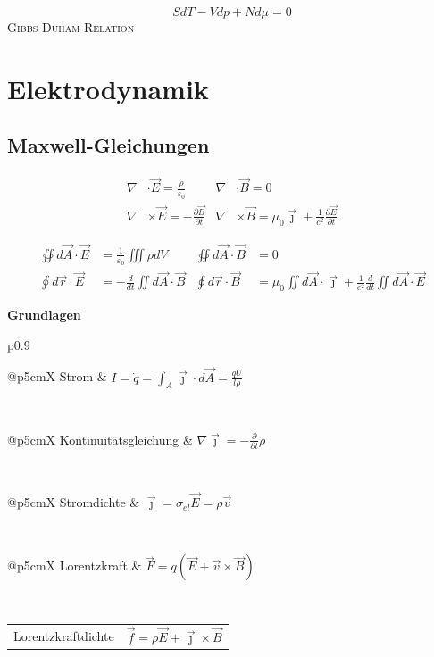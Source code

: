 \documentclass[12pt,a4paper, twoside]{article}
\makeatletter
\renewcommand{\d}[2]{\frac{d #1}{d #2}}
\newcommand{\pd}[2]{\frac{\partial #1}{\partial #2}}
\renewcommand{\=}[1]{\stackrel{#1}{=}}
\newcommand{\js}{\vec \jmath}
\newcommand{\eps}{\varepsilon}
\theoremstyle{definition}
\theoremstyle{remark}
\newcommand{\concept}[2]{%
\noindent
\begin{framed}
\noindent\textbf{#1}
\par\begin{tabular}{p{0.9\linewidth}}
#2
\end{tabular}
\end{framed}
}
\newcommand{\f}[2]{%
\noindent\begin{tabularx}{\linewidth}{@{}p{5cm}X}
#1 & $#2$
\end{tabularx}}
\makeatother
\begin{document}
\begin{center}
\begin{framed}
$$S dT - V dp + N d\mu = 0$$
\centering\textsc{Gibbs-Duham-Relation}
\end{framed}
\end{center}


\newpage
\section{Elektrodynamik}


\subsection{Maxwell-Gleichungen}

\begin{center}
\begin{framed}
\begin{align*}
\nabla & \cdot \vec E = \frac{\rho}{\varepsilon_0} & \nabla & \cdot \vec B = 0\\
\nabla &\times \vec E = - \pd{\vec{B}}{t} & \nabla & \times \vec B =  \mu_0 \vec \jmath + \frac{1}{c^2} \pd{\vec{E}}{t}
\end{align*}
\end{framed}
\end{center}

\begin{center}
\begin{framed}
\begin{align*}
\oiint d\vec A \cdot \vec E &= \frac{1}{\eps_0}\iiint \rho dV & \oiint d\vec A \cdot \vec B &= 0\\
\oint d\vec r \cdot \vec E &= - \d{}{t} \iint d\vec A \cdot \vec{B} & \oint d\vec r \cdot \vec B &= \mu_0 \iint d\vec A \cdot \js + \frac{1}{c^2} \d{}{t} \iint d\vec A \cdot \vec{E}
\end{align*}
\end{framed}
\end{center}

\concept{Grundlagen}{

\f{Strom}{I = \dot{q} = \int_A \vec{\jmath} \cdot d\vec{A} = \frac{q U}{l \rho}}\\
\f{Kontinuitätsgleichung}{\nabla \vec{\jmath} = -\pd{}{t} \rho}\\
\f{Stromdichte}{\vec{\jmath} = \sigma_{el} \vec{E} = \rho \vec{v}}\\
\f{Lorentzkraft}{\vec F = q(\vec E + \vec v \times \vec B)}\\
\f{Lorentzkraftdichte}{\vec f = \rho \vec E + \vec \jmath \times \vec B}
}
\end{document}
